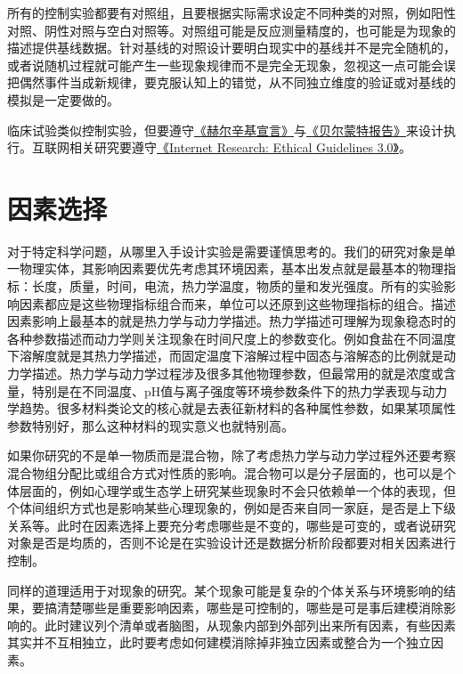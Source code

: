 \documentclass[]{tufte-book}
\begin{document}
所有的控制实验都要有对照组，且要根据实际需求设定不同种类的对照，例如阳性对照、阴性对照与空白对照等。对照组可能是反应测量精度的，也可能是为现象的描述提供基线数据。针对基线的对照设计要明白现实中的基线并不是完全随机的，或者说随机过程就可能产生一些现象规律而不是完全无现象，忽视这一点可能会误把偶然事件当成新规律，要克服认知上的错觉，从不同独立维度的验证或对基线的模拟是一定要做的。

临床试验类似控制实验，但要遵守\href{https://zh.wikipedia.org/zh-cn/\%E8\%B5\%AB\%E7\%88\%BE\%E8\%BE\%9B\%E5\%9F\%BA\%E5\%AE\%A3\%E8\%A8\%80}{《赫尔辛基宣言》}与\href{https://zh.wikipedia.org/wiki/\%E8\%B4\%9D\%E5\%B0\%94\%E8\%92\%99\%E7\%89\%B9\%E6\%8A\%A5\%E5\%91\%8A}{《贝尔蒙特报告》}来设计执行。互联网相关研究要遵守\href{https://aoir.org/reports/ethics3.pdf}{《Internet Research: Ethical Guidelines 3.0》}。

\hypertarget{ux56e0ux7d20ux9009ux62e9}{%
\section{因素选择}\label{ux56e0ux7d20ux9009ux62e9}}

对于特定科学问题，从哪里入手设计实验是需要谨慎思考的。我们的研究对象是单一物理实体，其影响因素要优先考虑其环境因素，基本出发点就是最基本的物理指标：长度，质量，时间，电流，热力学温度，物质的量和发光强度。所有的实验影响因素都应是这些物理指标组合而来，单位可以还原到这些物理指标的组合。描述因素影响上最基本的就是热力学与动力学描述。热力学描述可理解为现象稳态时的各种参数描述而动力学则关注现象在时间尺度上的参数变化。例如食盐在不同温度下溶解度就是其热力学描述，而固定温度下溶解过程中固态与溶解态的比例就是动力学描述。热力学与动力学过程涉及很多其他物理参数，但最常用的就是浓度或含量，特别是在不同温度、pH值与离子强度等环境参数条件下的热力学表现与动力学趋势。很多材料类论文的核心就是去表征新材料的各种属性参数，如果某项属性参数特别好，那么这种材料的现实意义也就特别高。

如果你研究的不是单一物质而是混合物，除了考虑热力学与动力学过程外还要考察混合物组分配比或组合方式对性质的影响。混合物可以是分子层面的，也可以是个体层面的，例如心理学或生态学上研究某些现象时不会只依赖单一个体的表现，但个体间组织方式也是影响某些心理现象的，例如是否来自同一家庭，是否是上下级关系等。此时在因素选择上要充分考虑哪些是不变的，哪些是可变的，或者说研究对象是否是均质的，否则不论是在实验设计还是数据分析阶段都要对相关因素进行控制。

同样的道理适用于对现象的研究。某个现象可能是复杂的个体关系与环境影响的结果，要搞清楚哪些是重要影响因素，哪些是可控制的，哪些是可是事后建模消除影响的。此时建议列个清单或者脑图，从现象内部到外部列出来所有因素，有些因素其实并不互相独立，此时要考虑如何建模消除掉非独立因素或整合为一个独立因素。
\end{document}
